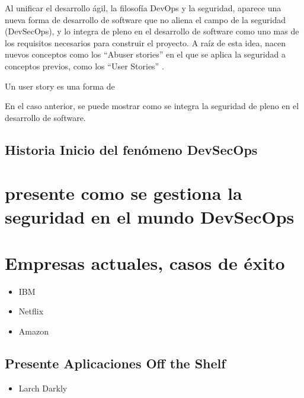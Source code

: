 \documentclass[12pt]{report} %
\begin{document}
Al unificar el desarrollo ágil, la filosofía DevOps y la seguridad, aparece una nueva forma de desarrollo de software que no aliena el campo de la seguridad (DevSecOps), y lo integra de pleno en el desarrollo de software como uno mas de los requisitos necesarios para construir el proyecto. 
A raíz de esta idea, nacen nuevos conceptos como los ``Abuser stories'' \cite{Bor2006} en el que se aplica la seguridad a conceptos previos, como los ``User Stories'' \cite{UserStories}.

Un user story es una forma de %
\cite{XPUserStory}

En el caso anterior, se puede mostrar como se integra la seguridad de pleno en el desarrollo de software.

\subsection{Historia Inicio del fenómeno DevSecOps}

\section{presente como se gestiona la seguridad en el mundo DevSecOps}

\section{Empresas actuales, casos de éxito}

\begin{itemize}
  \item{IBM}
  \item{Netflix}
  \item{Amazon}
\end{itemize}

\subsection{Presente Aplicaciones Off the Shelf}

\begin{itemize}
  \item{Larch Darkly}
\end{itemize}





\end{document}
